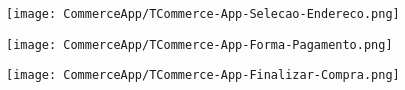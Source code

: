 \begin{center}
	\texttt{[image: CommerceApp/TCommerce-App-Selecao-Endereco.png]}
\end{center}

\begin{center}
	\texttt{[image: CommerceApp/TCommerce-App-Forma-Pagamento.png]}
\end{center}

\begin{center}
	\texttt{[image: CommerceApp/TCommerce-App-Finalizar-Compra.png]}
\end{center}


\begin{comment}
\section*{Publicações}
\newpage
\end{comment}
